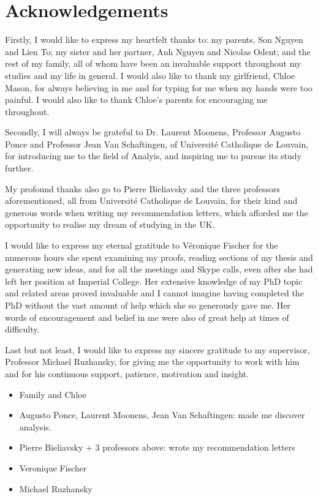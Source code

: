 \chapter*{Acknowledgements}

Firstly, I would like to express my heartfelt thanks to:
my parents, Son Nguyen and Lien To; my sister and her partner, Anh Nguyen and Nicolas Odent; and the rest of my family,
all of whom have been an invaluable support throughout my studies and my life in general.
I would also like to thank my girlfriend, Chloe Mason,
for always believing in me and for typing for me when my hands were too painful.
I would also like to thank Chloe's parents for encouraging me throughout.

Secondly, I will always be grateful to Dr. Laurent Moonens, Professor Augusto Ponce and Professor Jean Van Schaftingen,
of Universit\'e Catholique de Louvain,
for introducing me to the field of Analyis,
and inspiring me to pursue its study further.

My profound thanks also go to Pierre Bieliavsky and the three professors aforementioned,
all from Universit\'e Catholique de Louvain,
for their kind and generous words when writing my recommendation letters,
which afforded me the opportunity to realise my dream of studying in the UK.

I would like to express my eternal gratitude to V\'eronique Fischer for the numerous hours she spent examining my proofs,
reading sections of my thesis and generating new ideas,
and for all the meetings and Skype calls,
even after she had left her position at Imperial College.
Her extensive knowledge of my PhD topic and related areas proved invaluable and
I cannot imagine having completed the PhD without the vast amount of help which she so generously gave me.
Her words of encouragement and belief in me were also of great help at times of difficulty.

Last but not least,
I would like to express my sincere gratitude to my supervisor,
Professor Michael Ruzhansky,
for giving me the opportunity to work with him and for his continuous support, patience, motivation and insight.

\begin{itemize}
    \item Family and Chloe
    \item Augusto Ponce, Laurent Moonens, Jean Van Schaftingen: made me discover analysis.
    \item Pierre Bieliavsky + 3 professors above: wrote my recommendation letters
    \item Veronique Fischer
    \item Michael Ruzhansky
\end{itemize}

